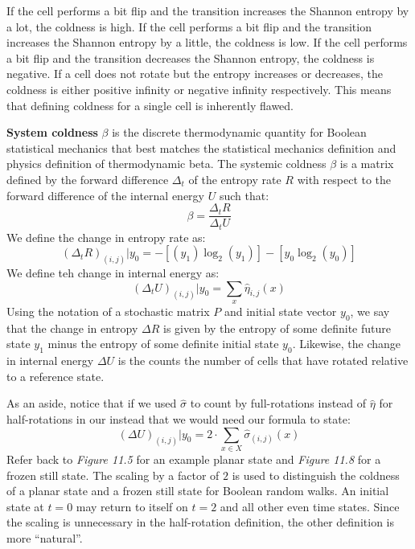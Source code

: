 \documentclass[10pt, a5paper, twoside, openright]{memoir}
\begin{document}
If the cell performs a bit flip and the transition increases the Shannon entropy by a lot, the coldness is high. If the cell performs a bit flip and the transition increases the Shannon entropy by a little, the coldness is low. If the cell performs a bit flip and the transition decreases the Shannon entropy, the coldness is negative. If a cell does not rotate but the entropy increases or decreases, the coldness is either positive infinity or negative infinity respectively. This means that defining coldness for a single cell is inherently flawed.

\textbf{System coldness} $\beta$ is the discrete thermodynamic quantity for Boolean statistical mechanics that best matches the statistical mechanics definition and physics definition of thermodynamic beta. The systemic coldness $\beta$ is a matrix defined by the forward difference $\Delta_t$ of the entropy rate $R$ with respect to the forward difference of the internal energy $U$ such that:
$$\beta = \frac{\Delta_t R}{\Delta_t U}$$
We define the change in entropy rate as:
$$(\Delta_t R)_{(i, j)} | y_0 = -[(y_1) \log_2 (y_1)] - [y_{0} \log_2 (y_{0})]$$
We define teh change in internal energy as:
$$(\Delta_t U)_{(i, j)} | y_0 = \sum\limits_x \hat \eta_{i, j}(x)$$
Using the notation of a stochastic matrix $P$ and initial state vector $y_0$, we say that the change in entropy $\Delta R$ is given by the entropy of some definite future state $y_1$ minus the entropy of some definite initial state $y_0$. Likewise, the change in internal energy $\Delta U$ is the counts the number of cells that have rotated relative to a reference state.

As an aside, notice that if we used $\hat \sigma$ to count by full-rotations instead of $\hat \eta$ for half-rotations in our instead that we would need our formula to state:
$$(\Delta U)_{(i, j)} | y_0 = 2 \cdot \sum\limits_{x \in X} \hat \sigma_{(i, j)}(x)$$
Refer back to \textit{Figure 11.5} for an example planar state and \textit{Figure 11.8} for a frozen still state. The scaling by a factor of $2$ is used to distinguish the coldness of a planar state and a frozen still state for Boolean random walks. An initial state at $t=0$ may return to itself on $t = 2$ and all other even time states. Since the scaling is unnecessary in the half-rotation definition, the other definition is more ``natural''.
\end{document}
